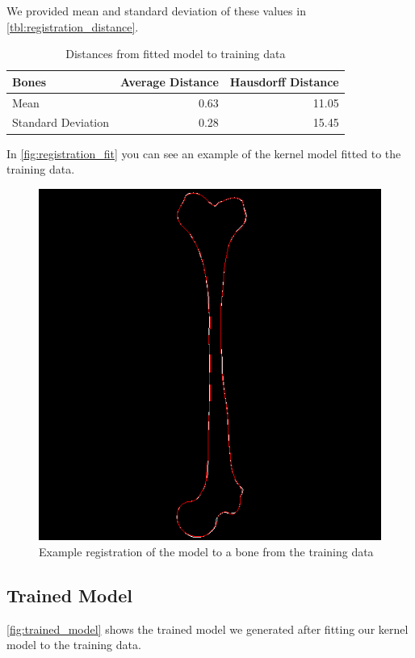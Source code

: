We provided mean and standard deviation of these values in \autoref{tbl:registration_distance}.

\begin{table}
\centering
\caption{Distances from fitted model to training data}
\label{tbl:registration_distance}
\begin{tabular}{lrr}
\toprule
\textbf{Bones} &
Average Distance &
Hausdorff Distance \\
\midrule
Mean& 0.63 & 11.05 \\
Standard Deviation& 0.28 & 15.45 \\
\bottomrule
\end{tabular}
\end{table}

In \autoref{fig:registration_fit} you can see an example of the kernel model fitted to the training data.

\begin{figure}
	\centering
  \includegraphics[scale=0.7]{./Figures/registration_fit}
  \caption{Example registration of the model to a bone from the training data}
  \label{fig:registration_fit}
\end{figure}


\subsection{Trained Model}
\label{subsec:trainedmodel}
\autoref{fig:trained_model} shows the trained model we generated after fitting our kernel model to the training data.

